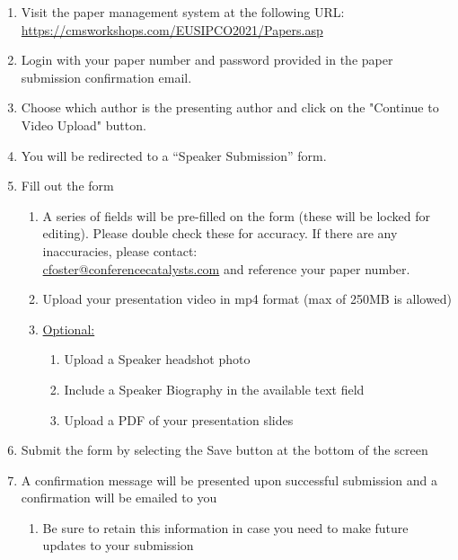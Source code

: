 \documentclass[english,a4paper,11pt,oneside,onecolumn]{article}
\begin{document}
\begin{enumerate}
    \item 
	Visit the paper management system at the following URL:\\ \url{https://cmsworkshops.com/EUSIPCO2021/Papers.asp}
\item	Login with your paper number and password provided in the paper submission confirmation email.
\item 	Choose which author is the presenting author and click on the "Continue to Video Upload" button.
\item 	You will be redirected to a “Speaker Submission” form. %

\item	Fill out the form
\begin{enumerate}
    \item A series of fields will be pre-filled on the form (these will be locked for editing). Please double check these for accuracy. If there are any inaccuracies, please contact:\\  \href{mailto:cfoster@conferencecatalysts.com}{cfoster@conferencecatalysts.com} and reference your paper number. 
    \item 	Upload your presentation video in mp4 format (max of 250MB is allowed)
\newpage
    \item 	\underline{Optional:}
\begin{enumerate}
    \item Upload a Speaker headshot photo
\item	Include a Speaker Biography in the available text field
\item	Upload a PDF of your presentation slides %
\end{enumerate}
\end{enumerate}
\item Submit the form by selecting the Save button at the bottom of the screen
\item 	A confirmation message will be presented upon successful submission and a confirmation will be emailed to you
\begin{enumerate}
\item 	Be sure to retain this information in case you need to make future updates to your submission
\end{enumerate}
\end{enumerate}
\end{document}
